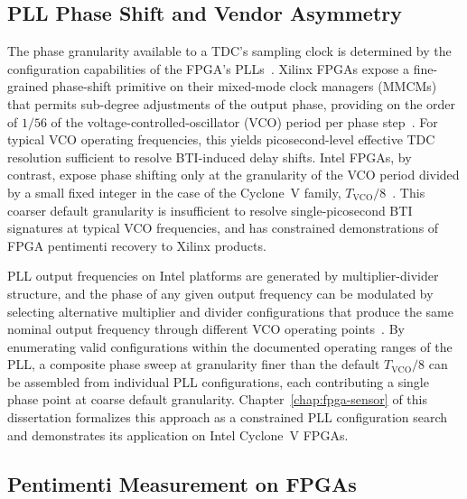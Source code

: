 \subsection{PLL Phase Shift and Vendor Asymmetry}

The phase granularity available to a TDC's sampling clock is determined
by the configuration capabilities of the FPGA's
PLLs~\cite{drewes2024turn}. Xilinx FPGAs expose a fine-grained
phase-shift primitive on their mixed-mode clock managers (MMCMs) that
permits sub-degree adjustments of the output phase, providing on the
order of $1/56$ of the voltage-controlled-oscillator (VCO) period per
phase step~\cite{drewes2024pentimento}. For typical VCO operating
frequencies, this yields picosecond-level effective TDC resolution
sufficient to resolve BTI-induced delay shifts. Intel FPGAs, by
contrast, expose phase shifting only at the granularity of the VCO
period divided by a small fixed integer in the case of the Cyclone~V
family, $T_\text{VCO}/8$~\cite{drewes2024turn}. This coarser default
granularity is insufficient to resolve single-picosecond BTI signatures
at typical VCO frequencies, and has constrained demonstrations of FPGA
pentimenti recovery to Xilinx products.

PLL output frequencies on Intel platforms are generated by
multiplier-divider structure, and the phase of any given output
frequency can be modulated by selecting alternative multiplier and
divider configurations that produce the same nominal output frequency
through different VCO operating points~\cite{drewes2024turn}. By
enumerating valid configurations within the documented operating ranges
of the PLL, a composite phase sweep at granularity finer than the
default $T_\text{VCO}/8$ can be assembled from individual PLL
configurations, each contributing a single phase point at coarse default
granularity. Chapter~\ref{chap:fpga-sensor} of this dissertation
formalizes this approach as a constrained PLL configuration search and
demonstrates its application on Intel Cyclone~V FPGAs.

\subsection{Pentimenti Measurement on FPGAs}

